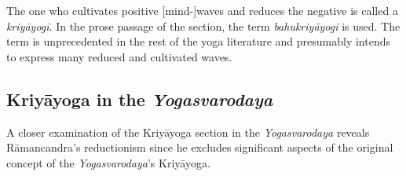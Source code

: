The one who cultivates positive [mind-]waves and reduces the negative is called a \textit{kriyāyogī}. In the prose passage of the section, the term \textit{bahukriyāyogi} is used. The term is unprecedented in the rest of the yoga literature and presumably intends to express many reduced and cultivated waves.

\subsection{Kriyāyoga in the \textit{Yogasvarodaya}}
A closer examination of the Kriyāyoga section in the \textit{Yogasvarodaya} reveals Rāmancandra's reductionism since he excludes significant aspects of the original concept of the \textit{Yogasvarodaya}'s Kriyāyoga.


